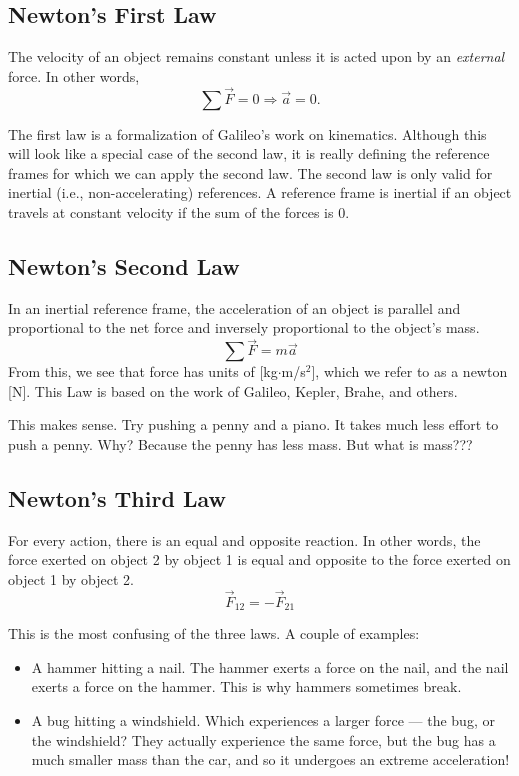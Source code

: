 \subsection{Newton's First Law}
The velocity of an object remains constant unless it is acted upon by an \textit{external} force. In other words,
$$\sum\vec{F}=0\Rightarrow \vec{a}=0.$$

The first law is a formalization of Galileo's work on kinematics. Although this will look like a special case of the second law, it is really defining the reference frames for which we can apply the second law. The second law is only valid for inertial (i.e., non-accelerating) references. A reference frame is inertial if an object travels at constant velocity if the sum of the forces is 0. 

\subsection{Newton's Second Law}
In an inertial reference frame, the acceleration of an object is parallel and proportional to the net force and inversely proportional to the object's mass.
$$\sum\vec{F}=m\vec{a}$$
From this, we see that force has units of [kg$\cdot$m/s$^2$], which we refer to as a newton [N]. This Law is based on the work of Galileo, Kepler, Brahe, and others.

This makes sense. Try pushing a penny and a piano. It takes much less effort to push a penny. Why? Because the penny has less mass. But what is mass???


\subsection{Newton's Third Law}
For every action, there is an equal and opposite reaction. In other words, the force exerted on object 2 by object 1 is equal and opposite to the force exerted on object 1 by object 2.
$$\vec{F}_{12}=-\vec{F}_{21}$$

This is the most confusing of the three laws. A couple of examples:
\begin{itemize}
\item A hammer hitting a nail. The hammer exerts a force on the nail, and the nail exerts a force on the hammer. This is why hammers sometimes break.
\item A bug hitting a windshield. Which experiences a larger force --- the bug, or the windshield? They actually experience the same force, but the bug has a much smaller mass than the car, and so it undergoes an extreme acceleration!
\end{itemize}

